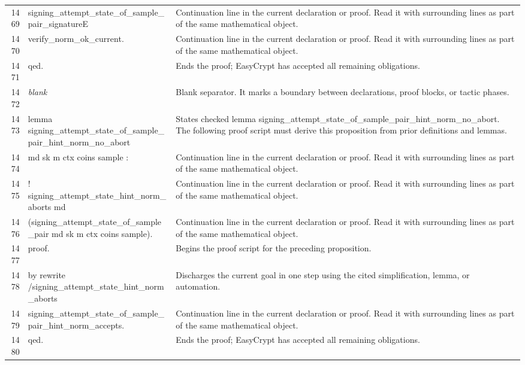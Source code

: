 \documentclass[10pt]{article}
\begin{document}
\begin{longtable}{r L{0.53\textwidth} L{0.37\textwidth}}
1469 & {\ttfamily\scriptsize            signing\_attempt\_state\_of\_sample\_pair\_signatureE} & Continuation line in the current declaration or proof.  Read it with surrounding lines as part of the same mathematical object. \\
1470 & {\ttfamily\scriptsize            verify\_norm\_ok\_current.} & Continuation line in the current declaration or proof.  Read it with surrounding lines as part of the same mathematical object. \\
1471 & {\ttfamily\scriptsize qed.} & Ends the proof; EasyCrypt has accepted all remaining obligations. \\
1472 & {\ttfamily\scriptsize \emph{blank}} & Blank separator.  It marks a boundary between declarations, proof blocks, or tactic phases. \\
1473 & {\ttfamily\scriptsize lemma signing\_attempt\_state\_of\_sample\_pair\_hint\_norm\_no\_abort} & States checked lemma signing\_attempt\_state\_of\_sample\_pair\_hint\_norm\_no\_abort.  The following proof script must derive this proposition from prior definitions and lemmas. \\
1474 & {\ttfamily\scriptsize    md sk m ctx coins sample :} & Continuation line in the current declaration or proof.  Read it with surrounding lines as part of the same mathematical object. \\
1475 & {\ttfamily\scriptsize   ! signing\_attempt\_state\_hint\_norm\_aborts md} & Continuation line in the current declaration or proof.  Read it with surrounding lines as part of the same mathematical object. \\
1476 & {\ttfamily\scriptsize       (signing\_attempt\_state\_of\_sample\_pair md sk m ctx coins sample).} & Continuation line in the current declaration or proof.  Read it with surrounding lines as part of the same mathematical object. \\
1477 & {\ttfamily\scriptsize proof.} & Begins the proof script for the preceding proposition. \\
1478 & {\ttfamily\scriptsize by rewrite /signing\_attempt\_state\_hint\_norm\_aborts} & Discharges the current goal in one step using the cited simplification, lemma, or automation. \\
1479 & {\ttfamily\scriptsize            signing\_attempt\_state\_of\_sample\_pair\_hint\_norm\_accepts.} & Continuation line in the current declaration or proof.  Read it with surrounding lines as part of the same mathematical object. \\
1480 & {\ttfamily\scriptsize qed.} & Ends the proof; EasyCrypt has accepted all remaining obligations. \\

\end{longtable}
\end{document}
